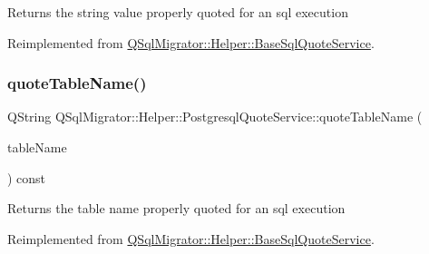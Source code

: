 \begin{DoxyReturn}{Returns}
the string value properly quoted for an sql execution 
\end{DoxyReturn}


Reimplemented from \hyperlink{class_q_sql_migrator_1_1_helper_1_1_base_sql_quote_service_a54146919b3027be887151bcc27c56dad}{Q\+Sql\+Migrator\+::\+Helper\+::\+Base\+Sql\+Quote\+Service}.

\mbox{\label{class_q_sql_migrator_1_1_helper_1_1_postgresql_quote_service_a56541b2bbc99faae890a9a21d50e14f6}} 
\subsubsection{\texorpdfstring{quote\+Table\+Name()}{quoteTableName()}}
{\footnotesize\ttfamily Q\+String Q\+Sql\+Migrator\+::\+Helper\+::\+Postgresql\+Quote\+Service\+::quote\+Table\+Name (\begin{DoxyParamCaption}\item[{const Q\+String \&}]{table\+Name }\end{DoxyParamCaption}) const\hspace{0.3cm}{\ttfamily [virtual]}}

\begin{DoxyReturn}{Returns}
the table name properly quoted for an sql execution 
\end{DoxyReturn}


Reimplemented from \hyperlink{class_q_sql_migrator_1_1_helper_1_1_base_sql_quote_service_aacd2ed13fd6f57bc77b4870ac5105f9e}{Q\+Sql\+Migrator\+::\+Helper\+::\+Base\+Sql\+Quote\+Service}.

\mbox{\label{class_q_sql_migrator_1_1_helper_1_1_postgresql_quote_service_a2cfc19b12c27e2e90c9db5a3680e6fac}} 

